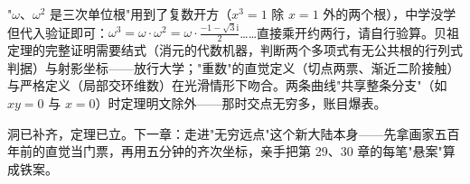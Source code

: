 \begin{chengshi}
"$\omega$、$\omega^2$ 是三次单位根"用到了复数开方（$x^3 = 1$ 除 $x=1$ 外的两个根），中学没学但代入验证即可：$\omega^3 = \omega\cdot\omega^2 = \omega\cdot\tfrac{-1-\sqrt3\mathrm{i}}2$……直接乘开约两行，请自行验算。贝祖定理的完整证明需要结式（消元的代数机器，判断两个多项式有无公共根的行列式判据）与射影坐标——放行大学；"重数"的直觉定义（切点两票、渐近二阶接触）与严格定义（局部交环维数）在光滑情形下吻合。两条曲线"共享整条分支"（如 $xy = 0$ 与 $x = 0$）时定理明文除外——那时交点无穷多，账目爆表。
\end{chengshi}

洞已补齐，定理已立。下一章：走进"无穷远点"这个新大陆本身——先拿画家五百年前的直觉当门票，再用五分钟的齐次坐标，亲手把第 29、30 章的每笔"悬案"算成铁案。
